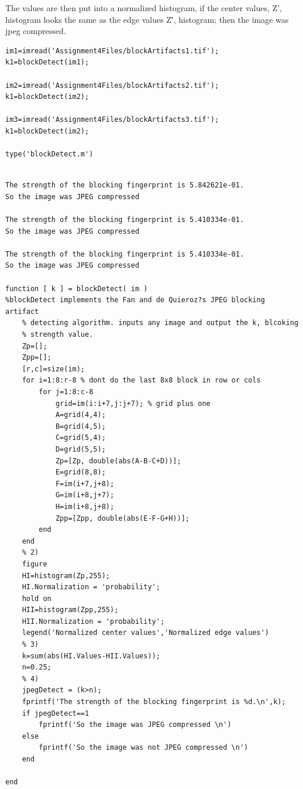 \documentclass{article}
\begin{document}
The values are then put into a normalized histogram, if the center values,
Z', histogram looks the same as the edge values Z\'', histogram; then
the image was jpeg compressed.


\begin{verbatim}
im1=imread('Assignment4Files/blockArtifacts1.tif');
k1=blockDetect(im1);

im2=imread('Assignment4Files/blockArtifacts2.tif');
k1=blockDetect(im2);

im3=imread('Assignment4Files/blockArtifacts3.tif');
k1=blockDetect(im2);

type('blockDetect.m')
\end{verbatim}

        \color{lightgray} \begin{verbatim}

The strength of the blocking fingerprint is 5.842621e-01.
So the image was JPEG compressed 

The strength of the blocking fingerprint is 5.410334e-01.
So the image was JPEG compressed 

The strength of the blocking fingerprint is 5.410334e-01.
So the image was JPEG compressed 

function [ k ] = blockDetect( im )
%blockDetect implements the Fan and de Quieroz?s JPEG blocking artifact
    % detecting algorithm. inputs any image and output the k, blcoking 
    % strength value. 
    Zp=[]; 
    Zpp=[];
    [r,c]=size(im); 
    for i=1:8:r-8 % dont do the last 8x8 block in row or cols 
        for j=1:8:c-8
            grid=im(i:i+7,j:j+7); % grid plus one 
            A=grid(4,4); 
            B=grid(4,5); 
            C=grid(5,4); 
            D=grid(5,5); 
            Zp=[Zp, double(abs(A-B-C+D))]; 
            E=grid(8,8); 
            F=im(i+7,j+8); 
            G=im(i+8,j+7); 
            H=im(i+8,j+8); 
            Zpp=[Zpp, double(abs(E-F-G+H))]; 
        end 
    end 
    % 2)
    figure 
    HI=histogram(Zp,255); 
    HI.Normalization = 'probability'; 
    hold on 
    HII=histogram(Zpp,255); 
    HII.Normalization = 'probability'; 
    legend('Normalized center values','Normalized edge values')
    % 3)
    k=sum(abs(HI.Values-HII.Values)); 
    n=0.25; 
    % 4) 
    jpegDetect = (k>n); 
    fprintf('The strength of the blocking fingerprint is %d.\n',k); 
    if jpegDetect==1
        fprintf('So the image was JPEG compressed \n')
    else
        fprintf('So the image was not JPEG compressed \n')
    end

end

\end{verbatim} \color{black}
\end{document}
